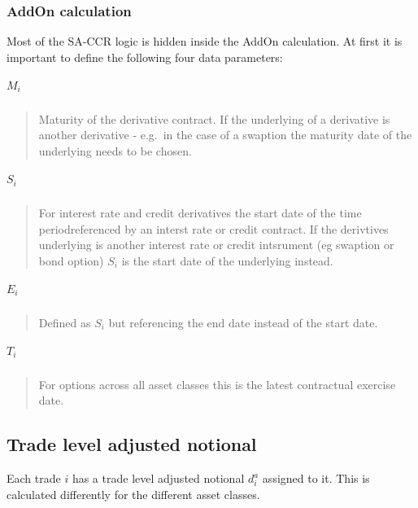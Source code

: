     

    
    \hypertarget{addon-calculation}{%
\subsubsection{AddOn calculation}\label{addon-calculation}}

Most of the SA-CCR logic is hidden inside the AddOn calculation. At
first it is important to define the following four data parameters:

\hypertarget{m_i}{%
\subparagraph{\texorpdfstring{\(M_i\)}{M\_i}}\label{m_i}}

\begin{quote}
Maturity of the derivative contract. If the underlying of a derivative
is another derivative - e.g.~in the case of a swaption the maturity date
of the underlying needs to be chosen.
\end{quote}

\hypertarget{s_i}{%
\subparagraph{\texorpdfstring{\(S_i\)}{S\_i}}\label{s_i}}

\begin{quote}
For interest rate and credit derivatives the start date of the time
periodreferenced by an interst rate or credit contract. If the
derivtives underlying is another interest rate or credit intsrument (eg
swaption or bond option) \(S_i\) is the start date of the underlying
instead.
\end{quote}

\hypertarget{e_i}{%
\subparagraph{\texorpdfstring{\(E_i\)}{E\_i}}\label{e_i}}

\begin{quote}
Defined as \(S_i\) but referencing the end date instead of the start
date.
\end{quote}

\hypertarget{t_i}{%
\subparagraph{\texorpdfstring{\(T_i\)}{T\_i}}\label{t_i}}

\begin{quote}
For options across all asset classes this is the latest contractual
exercise date.
\end{quote}

    \hypertarget{trade-level-adjusted-notional}{%
\subsection{Trade level adjusted
notional}\label{trade-level-adjusted-notional}}

Each trade \(i\) has a trade level adjusted notional \(d_i^a\) assigned
to it. This is calculated differently for the different asset classes.

